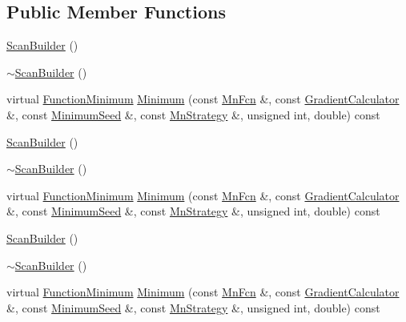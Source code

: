 \subsection*{Public Member Functions}
\begin{DoxyCompactItemize}
\item 
\mbox{\hyperlink{classROOT_1_1Minuit2_1_1ScanBuilder_a8fd7b342f53a78d0e5f7f086df93709e}{Scan\+Builder}} ()
\item 
\mbox{\hyperlink{classROOT_1_1Minuit2_1_1ScanBuilder_a9255e1e6791d3b627872e285b0a7156c}{$\sim$\+Scan\+Builder}} ()
\item 
virtual \mbox{\hyperlink{classROOT_1_1Minuit2_1_1FunctionMinimum}{Function\+Minimum}} \mbox{\hyperlink{classROOT_1_1Minuit2_1_1ScanBuilder_ad53e9711dc8a63958845ac6e6eb5250f}{Minimum}} (const \mbox{\hyperlink{classROOT_1_1Minuit2_1_1MnFcn}{Mn\+Fcn}} \&, const \mbox{\hyperlink{classROOT_1_1Minuit2_1_1GradientCalculator}{Gradient\+Calculator}} \&, const \mbox{\hyperlink{classROOT_1_1Minuit2_1_1MinimumSeed}{Minimum\+Seed}} \&, const \mbox{\hyperlink{classROOT_1_1Minuit2_1_1MnStrategy}{Mn\+Strategy}} \&, unsigned int, double) const
\item 
\mbox{\hyperlink{classROOT_1_1Minuit2_1_1ScanBuilder_a8fd7b342f53a78d0e5f7f086df93709e}{Scan\+Builder}} ()
\item 
\mbox{\hyperlink{classROOT_1_1Minuit2_1_1ScanBuilder_a9255e1e6791d3b627872e285b0a7156c}{$\sim$\+Scan\+Builder}} ()
\item 
virtual \mbox{\hyperlink{classROOT_1_1Minuit2_1_1FunctionMinimum}{Function\+Minimum}} \mbox{\hyperlink{classROOT_1_1Minuit2_1_1ScanBuilder_a24547691823b9f0977e6b23b6d084e7a}{Minimum}} (const \mbox{\hyperlink{classROOT_1_1Minuit2_1_1MnFcn}{Mn\+Fcn}} \&, const \mbox{\hyperlink{classROOT_1_1Minuit2_1_1GradientCalculator}{Gradient\+Calculator}} \&, const \mbox{\hyperlink{classROOT_1_1Minuit2_1_1MinimumSeed}{Minimum\+Seed}} \&, const \mbox{\hyperlink{classROOT_1_1Minuit2_1_1MnStrategy}{Mn\+Strategy}} \&, unsigned int, double) const
\item 
\mbox{\hyperlink{classROOT_1_1Minuit2_1_1ScanBuilder_a8fd7b342f53a78d0e5f7f086df93709e}{Scan\+Builder}} ()
\item 
\mbox{\hyperlink{classROOT_1_1Minuit2_1_1ScanBuilder_a9255e1e6791d3b627872e285b0a7156c}{$\sim$\+Scan\+Builder}} ()
\item 
virtual \mbox{\hyperlink{classROOT_1_1Minuit2_1_1FunctionMinimum}{Function\+Minimum}} \mbox{\hyperlink{classROOT_1_1Minuit2_1_1ScanBuilder_a24547691823b9f0977e6b23b6d084e7a}{Minimum}} (const \mbox{\hyperlink{classROOT_1_1Minuit2_1_1MnFcn}{Mn\+Fcn}} \&, const \mbox{\hyperlink{classROOT_1_1Minuit2_1_1GradientCalculator}{Gradient\+Calculator}} \&, const \mbox{\hyperlink{classROOT_1_1Minuit2_1_1MinimumSeed}{Minimum\+Seed}} \&, const \mbox{\hyperlink{classROOT_1_1Minuit2_1_1MnStrategy}{Mn\+Strategy}} \&, unsigned int, double) const
\end{DoxyCompactItemize}



